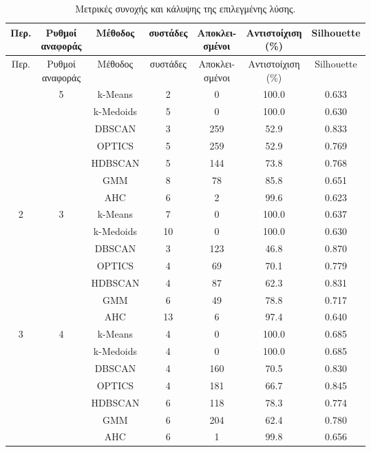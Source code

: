 \begingroup
\setlength{\tabcolsep}{4pt}
\setlength{\LTleft}{\fill}
\setlength{\LTright}{\fill}
\begin{longtable}{ccccccc}
\caption{Μετρικές συνοχής και κάλυψης της επιλεγμένης λύσης.}\label{tab:ambdfig:silhouette-coverage}\\
\toprule
Περ. & \makecell{Ρυθμοί\\αναφοράς} & Μέθοδος & συστάδες & \makecell{Αποκλει-\\σμένοι} & \makecell{Αντιστοίχιση\\(\%)} & Silhouette \\
\midrule
\endfirsthead
\toprule
Περ. & \makecell{Ρυθμοί\\αναφοράς} & Μέθοδος & συστάδες & \makecell{Αποκλει-\\σμένοι} & \makecell{Αντιστοίχιση\\(\%)} & Silhouette \\
\midrule
\endhead
\endfoot
\bottomrule
\endlastfoot
\multirow{7}{*}{1} & \multirow{7}{*}{5} & k-Means & 2 & 0 & 100.0 & 0.633 \\*
& & k-Medoids & 5 & 0 & 100.0 & 0.630 \\*
& & DBSCAN & 3 & 259 & 52.9 & 0.833 \\*
& & OPTICS & 5 & 259 & 52.9 & 0.769 \\*
& & HDBSCAN & 5 & 144 & 73.8 & 0.768 \\*
& & GMM & 8 & 78 & 85.8 & 0.651 \\*
& & AHC & 6 & 2 & 99.6 & 0.623 \\
\midrule
\multirow{7}{*}{2} & \multirow{7}{*}{3} & k-Means & 7 & 0 & 100.0 & 0.637 \\*
& & k-Medoids & 10 & 0 & 100.0 & 0.630 \\*
& & DBSCAN & 3 & 123 & 46.8 & 0.870 \\*
& & OPTICS & 4 & 69 & 70.1 & 0.779 \\*
& & HDBSCAN & 4 & 87 & 62.3 & 0.831 \\*
& & GMM & 6 & 49 & 78.8 & 0.717 \\*
& & AHC & 13 & 6 & 97.4 & 0.640 \\
\midrule
\multirow{7}{*}{3} & \multirow{7}{*}{4} & k-Means & 4 & 0 & 100.0 & 0.685 \\*
& & k-Medoids & 4 & 0 & 100.0 & 0.685 \\*
& & DBSCAN & 4 & 160 & 70.5 & 0.830 \\*
& & OPTICS & 4 & 181 & 66.7 & 0.845 \\*
& & HDBSCAN & 6 & 118 & 78.3 & 0.774 \\*
& & GMM & 6 & 204 & 62.4 & 0.780 \\*
& & AHC & 6 & 1 & 99.8 & 0.656 \\
\end{longtable}
\endgroup

